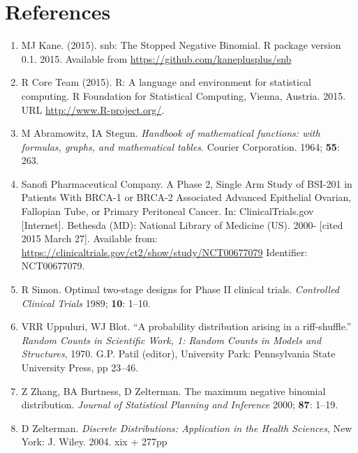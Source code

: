 \documentclass[12pt]{article}         %
\begin{document}


\section*     {\bf References}


\begin{enumerate}

\item[\bibref{Kane 2015}]
MJ Kane. (2015). snb: The Stopped Negative Binomial. R package version 0.1. 2015. Available from \url{https://github.com/kaneplusplus/snb}


\item[\bibref{R Core Team 2015}]
R Core Team (2015). R: A language and environment for statistical
computing. R Foundation for Statistical Computing, Vienna, Austria. 2015. URL \url{http://www.R-project.org/}.

\item[\bibref{abramowitz1964}]
M Abramowitz, IA Stegun. {\it Handbook of mathematical functions: with 
formulas, graphs, and mathematical tables}. Courier Corporation. 1964;
{\bf 55}: 263.

\item[\bibref{Sanofi 2013}]
Sanofi Pharmaceutical Company. A Phase 2, Single Arm Study of BSI-201 in Patients With BRCA-1 or BRCA-2 Associated Advanced Epithelial Ovarian, Fallopian Tube, or Primary Peritoneal Cancer. In: ClinicalTrials.gov [Internet]. Bethesda (MD): National Library of Medicine (US). 2000- [cited 2015 March 27]. Available from: \url{https://clinicaltrials.gov/ct2/show/study/NCT00677079} Identifier: NCT00677079.

\item[\bibref{Simon 1989}]
R Simon.  Optimal two-stage designs for Phase II clinical trials. {\it Controlled Clinical Trials\/} 1989; {\bf 10}: 1--10.

\item[\bibref{Uppuluri 1970}] 
VRR Uppuluri, WJ Blot. ``A probability distribution arising in a riff-shuffle.'' {\it Random Counts  in Scientific Work, 1: Random Counts in Models and Structures}, 1970. G.P. Patil (editor), University Park: Pennsylvania State University Press, pp  23--46.

\item[\bibref{Zhang 2000}]
Z Zhang, BA Burtness, D Zelterman.  The maximum negative binomial distribution. {\em Journal of Statistical Planning and Inference\/}  2000; {\bf 87}: 1--19.

\item[\bibref{Zelterman 2004}]
D Zelterman. {\it Discrete Distributions: Application in 
the Health Sciences}, New York: J. Wiley. 2004. xix + 277pp

\end{enumerate}
\end{document}
